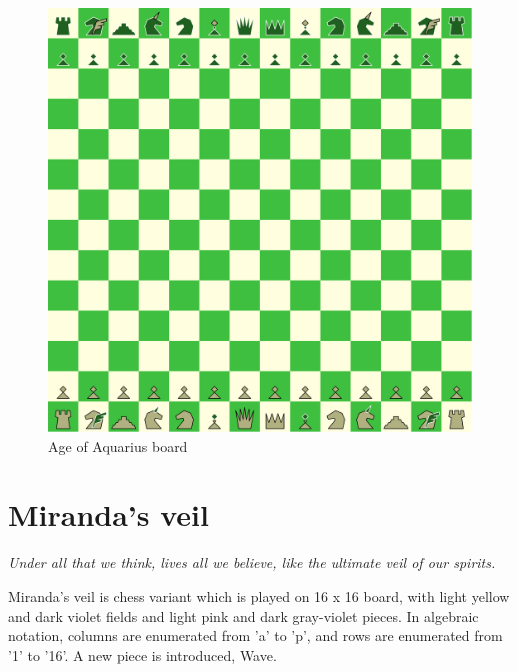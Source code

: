 \documentclass[a5paper,12pt,draft]{book} %
\begin{document}
\noindent
\begin{figure}[h]
\includegraphics[width=1.0\textwidth, keepaspectratio=true]{../gfx/boards/08_age_of_aquarius.png}
\caption{Age of Aquarius board}
\label{fig:age_of_aquarius}
\end{figure}

\clearpage

\chapter*{Miranda's veil}

\begin{flushright}
\parbox{0.8\textwidth}{
\emph{Under all that we think, lives all we believe, like the ultimate veil of our spirits. \\
 } }
\end{flushright}

Miranda's veil is chess variant which is played on 16 x 16 board,
with light yellow and dark violet fields and light pink and dark
gray-violet pieces. In algebraic notation, columns are enumerated
from 'a' to 'p', and rows are enumerated from '1' to '16'. A new
piece is introduced, Wave.
\end{document}
